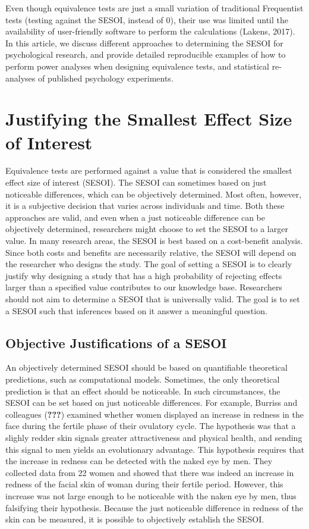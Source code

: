 \documentclass[english,man]{apa6}
\theoremstyle{definition}
\theoremstyle{definition}
\theoremstyle{definition}
\theoremstyle{remark}
\begin{document}
Even though equivalence tests are just a small variation of traditional
Frequentist tests (testing against the SESOI, instead of 0), their use
was limited until the availability of user-friendly software to perform
the calculations (Lakens, 2017). In this article, we discuss different
approaches to determining the SESOI for psychological research, and
provide detailed reproducible examples of how to perform power analyses
when designing equivalence tests, and statistical re-analyses of
published psychology experiments.

\section{Justifying the Smallest Effect Size of
Interest}\label{justifying-the-smallest-effect-size-of-interest}

Equivalence tests are performed against a value that is considered the
smallest effect size of interest (SESOI). The SESOI can sometimes based
on just noticeable differences, which can be objectively determined.
Most often, however, it is a subjective decision that varies across
individuals and time. Both these approaches are valid, and even when a
just noticeable difference can be objectively determined, researchers
might choose to set the SESOI to a larger value. In many research areas,
the SESOI is best based on a cost-benefit analysis. Since both costs and
benefits are necessarily relative, the SESOI will depend on the
researcher who designs the study. The goal of setting a SESOI is to
clearly justify why designing a study that has a high probability of
rejecting effects larger than a specified value contributes to our
knowledge base. Researchers should not aim to determine a SESOI that is
universally valid. The goal is to set a SESOI such that inferences based
on it answer a meaningful question.

\subsection{Objective Justifications of a
SESOI}\label{objective-justifications-of-a-sesoi}

An objectively determined SESOI should be based on quantifiable
theoretical predictions, such as computational models. Sometimes, the
only theoretical prediction is that an effect should be noticeable. In
such circumstances, the SESOI can be set based on just noticeable
differences. For example, Burriss and colleagues ({\textbf{???}})
examined whether women displayed an increase in redness in the face
during the fertile phase of their ovulatory cycle. The hypothesis was
that a slighly redder skin signals greater attractiveness and physical
health, and sending this signal to men yields an evolutionary advantage.
This hypothesis requires that the increase in redness can be detected
with the naked eye by men. They collected data from 22 women and showed
that there was indeed an increase in redness of the facial skin of woman
during their fertile period. However, this increase was not large enough
to be noticeable with the naken eye by men, thus falsifying their
hypothesis. Because the just noticeable difference in redness of the
skin can be measured, it is possible to objectively establish the SESOI.
\end{document}
